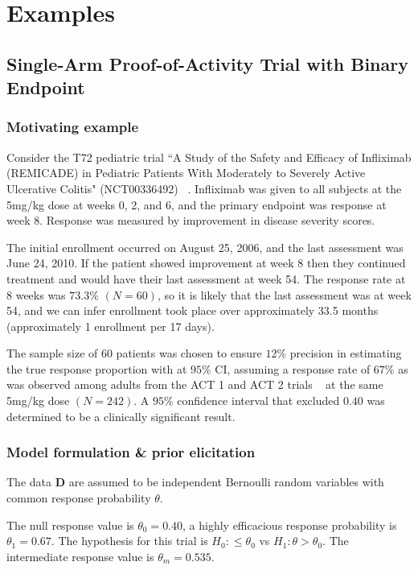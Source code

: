 \documentclass[12pt]{article}
\begin{document}
\section{Examples}\label{sec:examples}

\subsection{Single-Arm Proof-of-Activity Trial with Binary Endpoint}\label{sec:example1}
\subsubsection{Motivating example}
Consider the T72 pediatric trial ``A Study of the Safety and Efficacy of Infliximab (REMICADE) in Pediatric Patients With Moderately to Severely Active Ulcerative Colitis" (NCT00336492) ~\citep{Hyams2012}. Infliximab was given to all subjects at the 5mg/kg dose at weeks 0, 2, and 6, and the primary endpoint was response at week 8. Response was measured by improvement in disease severity scores.

The initial enrollment occurred on August 25, 2006, and the last assessment was June 24, 2010. If the patient showed improvement at week 8 then they continued treatment and would have their last assessment at week 54. The response rate at 8 weeks was $73.3\%$ $(N=60)$, so it is likely that the last assessment was at week 54, and we can infer enrollment took place over approximately 33.5 months (approximately 1 enrollment per 17 days). 

The sample size of $60$ patients was chosen to ensure $12\%$ precision in estimating the true response proportion with at $95\%$ CI, assuming a response rate of $67\%$ as was observed among adults from the ACT 1 and ACT 2 trials ~\citep{Rutgeerts2005} at the same 5mg/kg dose $(N=242)$. A $95\%$ confidence interval that excluded $0.40$ was determined to be a clinically significant result.

\subsubsection{Model formulation \& prior elicitation}\label{sec:example1model}
The data $\mathbf{D}$ are assumed to be independent Bernoulli random variables with common response probability $\theta$. 

The null response value is $\theta_0=0.40$, a highly efficacious response probability is $\theta_1=0.67$. The hypothesis for this trial is $H_0:\leq \theta_0$ vs $H_1:\theta > \theta_0$. The intermediate response value is $\theta_m=0.535$.
\end{document}
